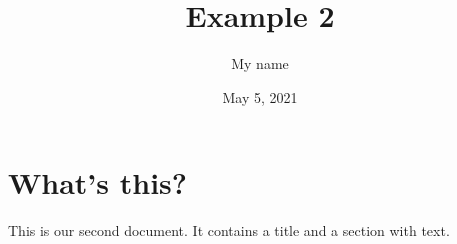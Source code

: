 \documentclass[a4paper,11pt]{article}
\title{Example 2}
\author{My name}
\date{May 5, 2021}
\begin{document}
\maketitle
\section{What's this?}
This is our second document. It contains a title and a section with text.
\end{document}
